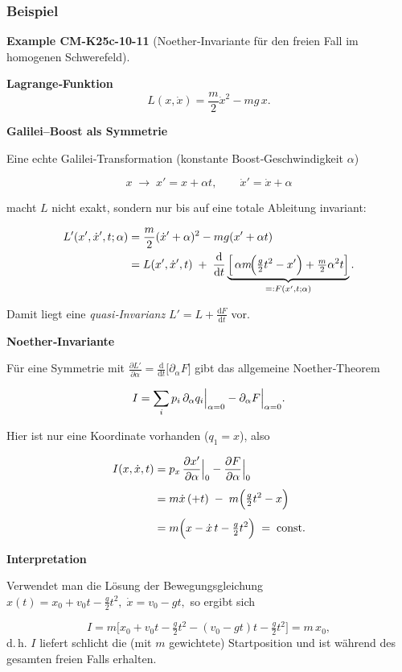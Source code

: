 \documentclass[10pt, letterpaper]{article}
\newcommand{\CustomHeading}[3]{%
  \par\medskip\noindent%
  \textbf{#1 #2} \textnormal{(#3)}.\enskip%
}
\newenvironment{EXA}[2]{\begin{unitbox}\CustomHeading{Example}{#1}{#2}}{\end{unitbox}}
\begin{document}
\subsubsection{Beispiel} 


\begin{EXA}{CM-K25c-10-11}{Noether‐Invariante für den freien Fall im homogenen Schwerefeld}
\textbf{Lagrange‐Funktion}
\[
  L(x,\dot x)=\frac{m}{2}\dot x^{2}-mg\,x .
\]

\textbf{Galilei–Boost als Symmetrie}

Eine echte Galilei‐Transformation (konstante Boost‐Geschwindigkeit
$\alpha$)

\[
  x\;\longrightarrow\;x' = x + \alpha t,
  \qquad
  \dot x' = \dot x + \alpha
\]

macht $L$ nicht exakt, sondern nur bis auf eine totale Ableitung
invariant:

\[
\begin{aligned}
  L'(x',\dot x',t;\alpha)
  &=\frac{m}{2}(\dot x'+\alpha)^{2}-mg(x'+\alpha t)\\
  &=L(x',\dot x',t)\;+\;
    \frac{\mathrm d}{\mathrm dt}
    \underbrace{%
      \Bigl[\,
        \alpha m\!\Bigl(\tfrac{g}{2}t^{2}-x'\Bigr)
       +\tfrac{m}{2}\alpha^{2}t
      \Bigr]}_{=:F(x',t;\alpha)} .
\end{aligned}
\]

Damit liegt eine \emph{quasi‐Invarianz}
$L'\!=\!L+\frac{\mathrm dF}{\mathrm dt}$ vor.

\textbf{Noether‐Invariante}

Für eine Symmetrie mit $\frac{\partial L'}{\partial\alpha}
      =\frac{\mathrm d}{\mathrm dt}\bigl[\partial_\alpha F\bigr]$
gibt das allgemeine Noether‐Theorem

\[
  I=\sum_{i}p_i\,\Bigl.\partial_\alpha q_i\Bigr|_{\alpha=0}
     -\Bigl.\partial_\alpha F\Bigr|_{\alpha=0}.
\]

Hier ist nur eine Koordinate vorhanden ($q_1=x$), also

\[
\begin{aligned}
  I(x,\dot x,t)
  &=
    p_x\,
    \Bigl.\frac{\partial x'}{\partial\alpha}\Bigr|_{0}
    -\Bigl.\frac{\partial F}{\partial\alpha}\Bigr|_{0} \\[4pt]
  &=
    m\dot x\,(+t)\;-\;
    m\Bigl(\tfrac{g}{2}t^{2}-x\Bigr) \\[4pt]
  &=
    m\Bigl(x-\dot x\,t-\tfrac{g}{2}t^{2}\Bigr)
    \;=\;\text{const.}
\end{aligned}
\]

\textbf{Interpretation}

Verwendet man die Lösung der Bewegungsgleichung
\(
  x(t)=x_{0}+v_{0}t-\tfrac{g}{2}t^{2},
  \;
  \dot x=v_{0}-gt,
\)
so ergibt sich

\[
  I = m\bigl[x_{0}+v_{0}t-\tfrac{g}{2}t^{2}
            -(v_{0}-gt)t-\tfrac{g}{2}t^{2}\bigr]
    = m\,x_{0},
\]
d.\,h. $I$ liefert schlicht die (mit $m$ gewichtete) Startposition
und ist während des gesamten freien Falls erhalten.
\end{EXA}
\end{document}
